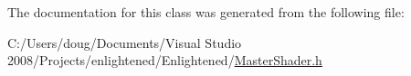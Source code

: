 The documentation for this class was generated from the following file:\begin{DoxyCompactItemize}
\item 
C:/Users/doug/Documents/Visual Studio 2008/Projects/enlightened/Enlightened/\hyperlink{_master_shader_8h}{MasterShader.h}\end{DoxyCompactItemize}

